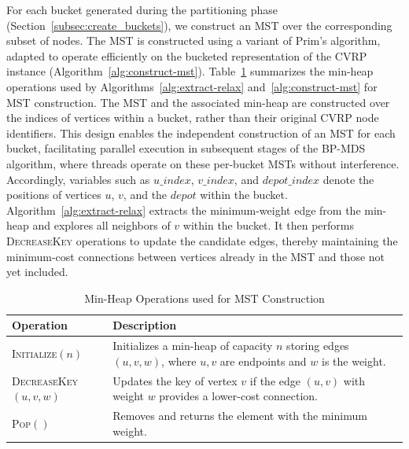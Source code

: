 For each bucket generated during the partitioning phase (Section~\ref{subsec:create_buckets}), we construct an MST over the corresponding subset of nodes. The MST is constructed using a variant of Prim’s algorithm, adapted to operate efficiently on the bucketed representation of the CVRP instance (Algorithm~\ref{alg:construct-mst}). Table~\ref{table:heap-operations} summarizes the min-heap operations used by Algorithms~\ref{alg:extract-relax} and~\ref{alg:construct-mst} for MST construction. The MST and the associated min-heap are constructed over the indices of vertices within a bucket, rather than their original CVRP node identifiers. This design enables the independent construction of an MST for each bucket, facilitating parallel execution in subsequent stages of the BP-MDS algorithm, where threads operate on these per-bucket MSTs without interference. Accordingly, variables such as $u\_index$, $v\_index$, and $depot\_index$ denote the positions of vertices $u$, $v$, and the $depot$ within the bucket. Algorithm~\ref{alg:extract-relax} extracts the minimum-weight edge from the min-heap and explores all neighbors of $v$ within the bucket. It then performs \textsc{DecreaseKey} operations to update the candidate edges, thereby maintaining the minimum-cost connections between vertices already in the MST and those not yet included. 

\begin{table}[htbp]
\centering
\caption{Min-Heap Operations used for MST Construction}
\label{table:heap-operations}
\begin{tabular}{l p{5cm}}
\toprule %
\textbf{Operation} & \textbf{Description} \\
\midrule 

\textsc{Initialize}$(n)$ & Initializes a min-heap of capacity $n$ storing edges $(u, v, w)$, where $u, v$ are endpoints and $w$ is the weight. \\

\addlinespace 

\textsc{DecreaseKey}$(u, v, w)$ 
& Updates the key of vertex $v$ if the edge $(u, v)$ with weight $w$ provides a lower-cost connection. \\

\addlinespace

\textsc{Pop}$()$ 
& Removes and returns the element with the minimum weight. \\
\bottomrule %
\end{tabular}
\end{table}

